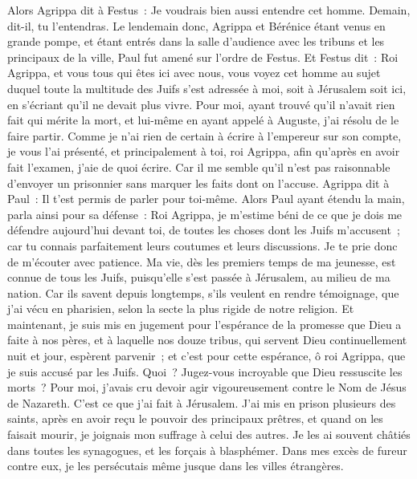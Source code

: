 \begin{multicols}{2}
Alors Agrippa dit à Festus~: Je voudrais bien aussi entendre cet homme. Demain, dit-il, tu l'entendras.
Le lendemain donc, Agrippa et Bérénice étant venus en grande pompe, et étant entrés dans la salle d'audience avec les tribuns et les principaux de la ville, Paul fut amené sur l'ordre de Festus.
Et Festus dit~: Roi Agrippa, et vous tous qui êtes ici avec nous, vous voyez cet homme au sujet duquel toute la multitude des Juifs s'est adressée à moi, soit à Jérusalem soit ici, en s'écriant qu'il ne devait plus vivre.
Pour moi, ayant trouvé qu'il n'avait rien fait qui mérite la mort, et lui-même en ayant appelé à Auguste, j'ai résolu de le faire partir.
Comme je n'ai rien de certain à écrire à l'empereur sur son compte, je vous l'ai présenté, et principalement à toi, roi Agrippa, afin qu'après en avoir fait l'examen, j'aie de quoi écrire.
Car il me semble qu'il n'est pas raisonnable d'envoyer un prisonnier sans marquer les faits dont on l'accuse.
\VerseOne{}Agrippa dit à Paul~: Il t'est permis de parler pour toi-même. Alors Paul ayant étendu la main, parla ainsi pour sa défense~:
Roi Agrippa, je m'estime béni de ce que je dois me défendre aujourd'hui devant toi, de toutes les choses dont les Juifs m'accusent~;
car tu connais parfaitement leurs coutumes et leurs discussions. Je te prie donc de m'écouter avec patience.
Ma vie, dès les premiers temps de ma jeunesse, est connue de tous les Juifs, puisqu'elle s'est passée à Jérusalem, au milieu de ma nation.
Car ils savent depuis longtemps, s'ils veulent en rendre témoignage, que j'ai vécu en pharisien, selon la secte la plus rigide de notre religion.
Et maintenant, je suis mis en jugement pour l'espérance de la promesse que Dieu a faite à nos pères,
et à laquelle nos douze tribus, qui servent Dieu continuellement nuit et jour, espèrent parvenir~; et c'est pour cette espérance, ô roi Agrippa, que je suis accusé par les Juifs.
Quoi~? Jugez-vous incroyable que Dieu ressuscite les morts~?
Pour moi, j'avais cru devoir agir vigoureusement contre le Nom de Jésus de Nazareth.
C'est ce que j'ai fait à Jérusalem. J'ai mis en prison plusieurs des saints, après en avoir reçu le pouvoir des principaux prêtres, et quand on les faisait mourir, je joignais mon suffrage à celui des autres.
Je les ai souvent châtiés dans toutes les synagogues, et les forçais à blasphémer. Dans mes excès de fureur contre eux, je les persécutais même jusque dans les villes étrangères.

\end{multicols}
